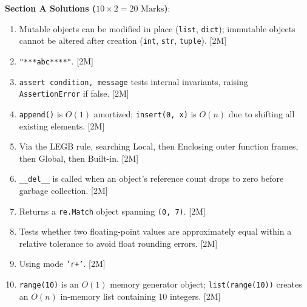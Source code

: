 \begin{solutionbox}
\noindent\textbf{Section A Solutions ($10 \times 2 = 20\text{ Marks}$)}:
\begin{enumerate}
    \item Mutable objects can be modified in place (\texttt{list}, \texttt{dict}); immutable objects cannot be altered after creation (\texttt{int}, \texttt{str}, \texttt{tuple}). [2M]
    \item \texttt{"***abc****"}. [2M]
    \item \texttt{assert condition, message} tests internal invariants, raising \texttt{AssertionError} if false. [2M]
    \item \texttt{append()} is $O(1)$ amortized; \texttt{insert(0, x)} is $O(n)$ due to shifting all existing elements. [2M]
    \item Via the LEGB rule, searching Local, then Enclosing outer function frames, then Global, then Built-in. [2M]
    \item \texttt{\_\_del\_\_} is called when an object's reference count drops to zero before garbage collection. [2M]
    \item Returns a \texttt{re.Match} object spanning \texttt{(0, 7)}. [2M]
    \item Tests whether two floating-point values are approximately equal within a relative tolerance to avoid float rounding errors. [2M]
    \item Using mode \texttt{'r+'}. [2M]
    \item \texttt{range(10)} is an $O(1)$ memory generator object; \texttt{list(range(10))} creates an $O(n)$ in-memory list containing 10 integers. [2M]
\end{enumerate}


\end{solutionbox}
